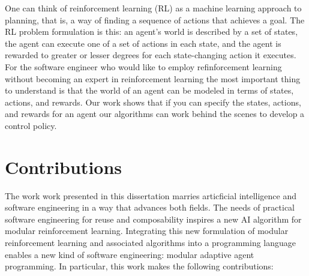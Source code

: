 One can think of reinforcement learning (RL) as a machine learning approach to planning, that is, a way of finding a sequence of actions that achieves a goal.  The RL problem formulation is this: an agent's world is described by a set of states, the agent can execute one of a set of actions in each state, and the agent is rewarded to greater or lesser degrees for each state-changing action it executes. For the software engineer who would like to employ refinforcement learning without becoming an expert in reinforcement learning the most important thing to understand is that the world of an agent can be modeled in terms of states, actions, and rewards. Our work shows that if you can specify the states, actions, and rewards for an agent our algorithms can work behind the scenes to develop a control policy.


\section{Contributions}

The work work presented in this dissertation marries articficial intelligence and software engineering in a way that advances both fields. The needs of practical software engineering for reuse and composability inspires a new AI algorithm for modular reinforcement learning. Integrating this new formulation of modular reinforcement learning and associated algorithms into a programming language enables a new kind of software engineering: modular adaptive agent programming. In particular, this work makes the following contributions:

